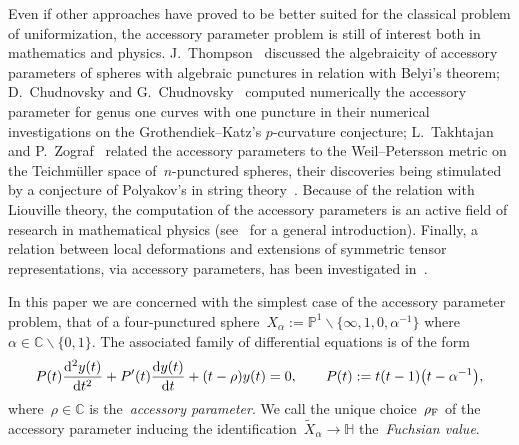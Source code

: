 \documentclass[pdftex]{sigma}
\newcommand{\C}{\mathbb{C}}
\newcommand{\pro}{\mathbb{P}}
\newcommand{\Po}{\mathbb{H}}
\numberwithin{equation}{section}
\begin{document}
Even if other approaches have proved to be better suited for the classical problem of uniformization, the accessory parameter problem is still of interest both in mathematics and physics. J.~Thompson~\cite{Thompson} discussed the algebraicity of accessory parameters of spheres with algebraic punctures in relation with Belyi's theorem; D.~Chudnovsky and G.~Chudnovsky~\cite{Chudnovsky} computed numerically the accessory parameter for genus one curves with one puncture in their numerical investigations on the Grothendiek--Katz's $p$-curvature conjecture; L.~Takhtajan and P.~Zograf~\cite{TZ1} related the accessory parameters to the Weil--Petersson metric on the Teichm\"uller space of~$n$-punctured spheres, their discoveries being stimulated by a conjecture of Polyakov's in string theory~\cite{Polyakov}. Because of the relation with Liouville theory, the computation of the accessory parameters is an active field of research in mathematical physics (see~\cite{T2} for a general introduction). Finally, a relation between local deformations and extensions of symmetric tensor representations, via accessory parameters, has been investigated in~\cite{Bogo}.

In this paper we are concerned with the simplest case of the accessory parameter problem, that of a four-punctured sphere~$X_\alpha:=\pro^1\smallsetminus\big\{\infty,1,0,\alpha^{-1}\big\}$ where~$\alpha\in\C\smallsetminus\{0,1\}$. The associated family of differential equations is of the form
\begin{equation}\label{eqn:dei}
P(t)\frac{{\rm d}^2y(t)}{{\rm d}t^2} +{P'(t)}\frac{{\rm d}y(t)}{{\rm d}t} +{(t-\rho)}y(t) =0 ,\qquad P(t) :=t(t-1)\big(t-\alpha^{-1}\big),
\end{equation}
where~$\rho\in\C$ is the~\emph{accessory parameter}. We call the unique choice~$\rho_{\rm F}$ of the accessory parameter inducing the identification~$\widetilde{X}_\alpha\to\Po$ the~\emph{Fuchsian value}.
\end{document}
